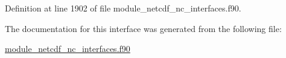 Definition at line 1902 of file module\+\_\+netcdf\+\_\+nc\+\_\+interfaces.\+f90.



The documentation for this interface was generated from the following file\+:\begin{DoxyCompactItemize}
\item 
\hyperlink{module__netcdf__nc__interfaces_8f90}{module\+\_\+netcdf\+\_\+nc\+\_\+interfaces.\+f90}\end{DoxyCompactItemize}
